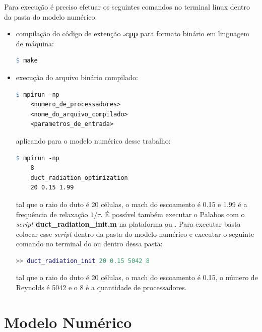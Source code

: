 Para execução é preciso efetuar os seguintes comandos no terminal linux dentro da pasta do modelo numérico:
\begin{itemize}
  \item compilação do código de extenção \textbf{.cpp} para formato binário em linguagem de máquina:
  \begin{lstlisting}[language=make, frame = single]
    $ make
  \end{lstlisting}
  \item execução do arquivo binário compilado:
  \begin{lstlisting}[language=make, frame = single]
    $ mpirun -np 
    <numero_de_processadores> 
    <nome_do_arquivo_compilado> 
    <parametros_de_entrada>
  \end{lstlisting}
  aplicando para o modelo numérico desse trabalho:
  \begin{lstlisting}[language=make, frame = single]
    $ mpirun -np 
    8
    duct_radiation_optimization
    20 0.15 1.99
  \end{lstlisting}
  tal que o raio do duto é 20 células, o mach do escoamento é 0.15 e 1.99 é a frequência de relaxação $1/\tau$. É possível também executar o Palabos com o \textit{script} \textbf{duct\_radiation\_init.m} na plataforma  ou . Para executar basta colocar esse \textit{script} dentro da pasta do modelo numérico e executar o seguinte comando no terminal do  ou  dentro dessa pasta:
  \begin{lstlisting}[language=matlab, frame = single]
    >> duct_radiation_init 20 0.15 5042 8
  \end{lstlisting}
  tal que o raio do duto é 20 células, o mach do escoamento é 0.15, o número de Reynolds é 5042 e o 8 é a quantidade de processadores.
\end{itemize}


\section{Modelo Numérico}